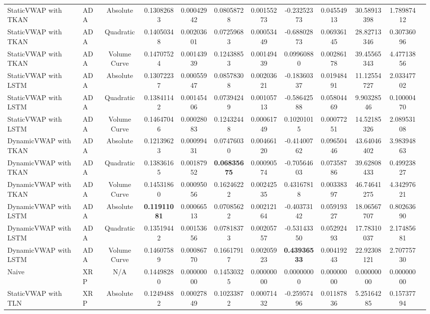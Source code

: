 \begin{table}[H]
{\begin{tabular}{llcccccccccc}
        StaticVWAP with TKAN & ADA & Absolute & 0.13082683 & 0.00042942 & 0.08058728 & 0.00155273 & -0.23252373 & 0.04554913 & 30.58913398 & 1.78987412 \\
        StaticVWAP with TKAN & ADA & Quadratic & 0.14050348 & 0.00203601 & 0.07259683 & 0.00053449 & -0.68802873 & 0.06936145 & 28.82713346 & 0.30736096 \\
        StaticVWAP with TKAN & ADA & Volume Curve & 0.14707524 & 0.00143939 & 0.12438853 & 0.00149439 & 0.09960880 & 0.00286178 & 39.45565343 & 4.47713856 \\
        StaticVWAP with LSTM & ADA & Absolute & 0.13072237 & 0.00055947 & 0.08578308 & 0.00203621 & -0.18360337 & 0.01948491 & 11.12554727 & 2.03347702 \\
        StaticVWAP with LSTM & ADA & Quadratic & 0.13841142 & 0.00145406 & 0.07394249 & 0.00105713 & -0.58642588 & 0.05804469 & 9.90328546 & 0.10000470 \\
        StaticVWAP with LSTM & ADA & Volume Curve & 0.14647046 & 0.00028083 & 0.12432448 & 0.00061749 & 0.10201015 & 0.00077251 & 14.52185326 & 2.08953108 \\
        DynamicVWAP with TKAN & ADA & Absolute & 0.12139623 & 0.00099431 & 0.07476030 & 0.00466120 & -0.41400762 & 0.09650446 & 43.64046402 & 3.98394863 \\
        DynamicVWAP with TKAN & ADA & Quadratic & 0.13836165 & 0.00187952 & \textbf{0.06835675} & 0.00090574 & -0.70564603 & 0.07358786 & 39.62808433 & 0.49923827 \\
        DynamicVWAP with TKAN & ADA & Volume Curve & 0.14531860 & 0.00095056 & 0.16246222 & 0.00242535 & 0.43167818 & 0.00338397 & 46.74641275 & 4.34297621 \\
        DynamicVWAP with LSTM & ADA & Absolute & \textbf{0.11911081} & 0.00066513 & 0.07085622 & 0.00212164 & -0.40373142 & 0.05919327 & 18.06567707 & 0.80263690 \\
        DynamicVWAP with LSTM & ADA & Quadratic & 0.13519442 & 0.00153656 & 0.07818373 & 0.00205757 & -0.53143350 & 0.05292493 & 17.78310037 & 2.17485681 \\
        DynamicVWAP with LSTM & ADA & Volume Curve & 0.14607589 & 0.00086770 & 0.16617917 & 0.00205923 & \textbf{0.43936533} & 0.00419243 & 22.92308121 & 2.70775730 \\
        \hline
        Naive & XRP & N/A & 0.14498280 & 0.00000000 & 0.14530325 & 0.00000000 & 0.00000000 & 0.00000000 & 0.00000000 & 0.00000000 \\
        StaticVWAP with TLN & XRP & Absolute & 0.12494882 & 0.00027849 & 0.10233872 & 0.00071432 & -0.25957496 & 0.01187836 & 5.25164285 & 0.15737794 \\

\end{tabular}}
\end{table}
